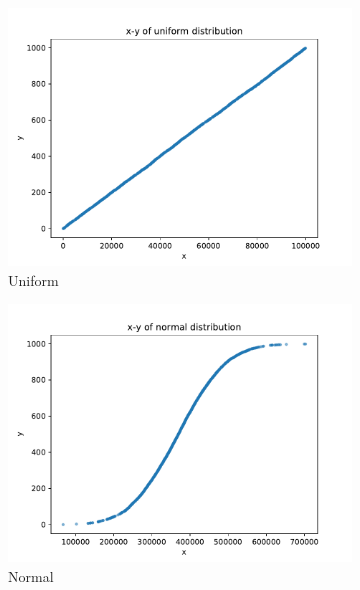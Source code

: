 \begin{figure}
    \centering
    \begin{subfigure}[b]{0.3\textwidth}
    	\includegraphics[width=\textwidth]{graphs/evaluation/uniform.pdf}
    	\caption{Uniform}
    \end{subfigure}
    \hfill
	\begin{subfigure}[b]{0.3\textwidth}
    	\includegraphics[width=\textwidth]{graphs/evaluation/normal.pdf}
    	\caption{Normal}
    \end{subfigure}
    \hfill
    \begin{subfigure}[b]{0.3\textwidth}

\end{subfigure}
\end{figure}
